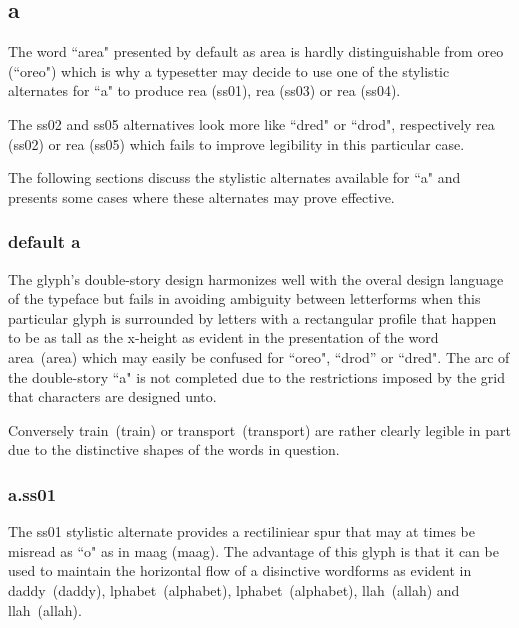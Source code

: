 \subsection{a}

The word ``area" presented by default as {\ssdefault area} is hardly
distinguishable from {\ssdefault oreo} (``oreo") which is why a typesetter may
decide to use one of the stylistic alternates for ``a" to produce
{re{\ssone a}} (ss01),
{re{\ssthree a}} (ss03) or
{re{\ssfour a}} (ss04).

The ss02 and ss05 alternatives look more like ``dred" or ``drod", respectively
{re{\sstwo a}} (ss02) or
{re{\ssfive a}} (ss05)
which fails to improve legibility in this particular case.

The following sections discuss the stylistic alternates available for ``a" and
presents some cases where these alternates may prove effective.

\subsubsection{default {\ssdefault a}}

The glyph's double-story design harmonizes well with the overal design
language of the typeface but fails in avoiding ambiguity between letterforms
when this particular glyph is surrounded by letters with a rectangular profile
that happen to be as tall as the x-height as evident in the presentation of the
word \mbox{{\ssdefault area} (area)} which may easily be confused for ``oreo",
``drod'' or ``dred". The arc of the double-story ``a" is not completed due to
the restrictions imposed by the grid that characters are designed unto.

Conversely
\mbox{{\ssdefault train} (train)} or
\mbox{{\ssdefault transport} (transport)}
are rather clearly legible in part due to the distinctive shapes of the words
in question.

\subsubsection{{\ssone a}.ss01}

The ss01 stylistic alternate provides a rectiliniear spur that may at times be
misread as ``o" as in \mbox{\ssdefault m{\ssone aa}g} (maag). The advantage of
this glyph is that it can be used to maintain the horizontal flow of a disinctive
wordforms as evident in
\mbox{{\ssdefault d{\ssone a}ddy} (daddy)},
\mbox{{lphabet} (alphabet)},
\mbox{{lph{\ssone a}bet} (alphabet)},
\mbox{{llah} (allah)} and
\mbox{{ll{\ssone a}h} (allah)}.

